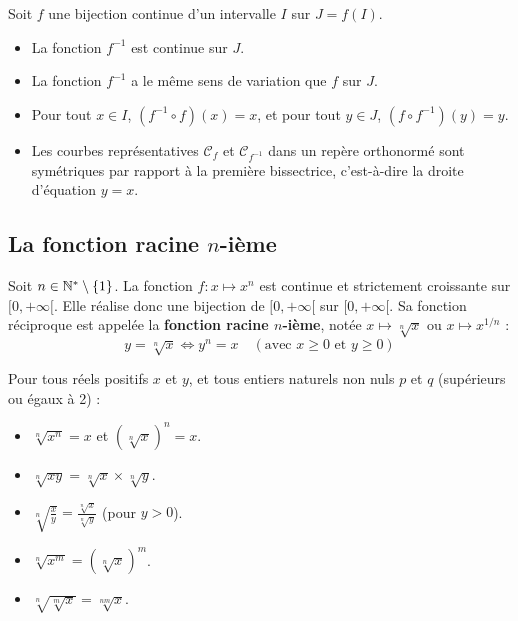 \begin{propriete}
Soit $f$ une bijection continue d'un intervalle $I$ sur $J = f(I)$.
\begin{itemize}
    \item La fonction $f^{-1}$ est continue sur $J$.
    \item La fonction $f^{-1}$ a le même sens de variation que $f$ sur $J$.
    \item Pour tout $x \in I$, $(f^{-1} \circ f)(x) = x$, et pour tout $y \in J$, $(f \circ f^{-1})(y) = y$.
    \item Les courbes représentatives $\mathcal{C}_f$ et $\mathcal{C}_{f^{-1}}$ dans un repère orthonormé sont symétriques par rapport à la première bissectrice, c'est-à-dire la droite d'équation $y = x$.
\end{itemize}
\end{propriete}

\subsection{La fonction racine $n$-ième}

\begin{definition}
Soit $n \in \mathbb{N}^* \setminus \{1\}$.
La fonction $f: x \mapsto x^n$ est continue et strictement croissante sur $[0, +\infty[$. Elle réalise donc une bijection de $[0, +\infty[$ sur $[0, +\infty[$.
Sa fonction réciproque est appelée la \textbf{fonction racine $n$-ième}, notée $x \mapsto \sqrt[n]{x}$ ou $x \mapsto x^{1/n}$ :
\[
y = \sqrt[n]{x} \iff y^n = x \quad (\text{avec } x \ge 0 \text{ et } y \ge 0)
\]
\end{definition}

\begin{propriete}
Pour tous réels positifs $x$ et $y$, et tous entiers naturels non nuls $p$ et $q$ (supérieurs ou égaux à 2) :
\begin{itemize}
    \item $\sqrt[n]{x^n} = x$ \quad et \quad $(\sqrt[n]{x})^n = x$.
    \item $\sqrt[n]{xy} = \sqrt[n]{x} \times \sqrt[n]{y}$.
    \item $\sqrt[n]{\frac{x}{y}} = \frac{\sqrt[n]{x}}{\sqrt[n]{y}}$ \quad (pour $y > 0$).
    \item $\sqrt[n]{x^m} = (\sqrt[n]{x})^m$.
    \item $\sqrt[n]{\sqrt[m]{x}} = \sqrt[nm]{x}$.
\end{itemize}
\end{propriete}

